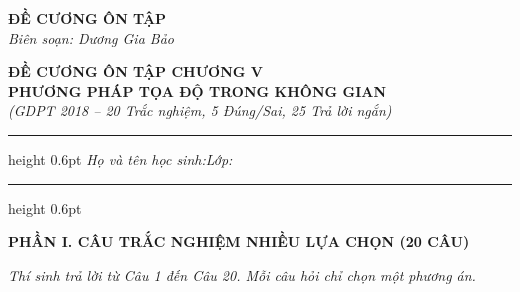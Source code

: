 \documentclass[12pt,a4paper]{article}
\begin{document}
\thispagestyle{firstpage}

\noindent
\begin{minipage}[t]{0.36\textwidth}
    \centering
    {\fontsize{12}{14}\selectfont\textbf{ĐỀ CƯƠNG ÔN TẬP}}\\[4pt]
    \textit{Biên soạn: Dương Gia Bảo}\\[6pt]
    \setlength{\fboxrule}{0.8pt}
    \setlength{\fboxsep}{5pt}
\end{minipage}\hfill
\begin{minipage}[t]{0.62\textwidth}
    \centering
    {\fontsize{13}{15}\selectfont\textbf{ĐỀ CƯƠNG ÔN TẬP CHƯƠNG V}}\\[3pt]
    {\fontsize{12}{14}\selectfont\textbf{PHƯƠNG PHÁP TỌA ĐỘ TRONG KHÔNG GIAN}}\\[3pt]
    {\fontsize{11}{13}\selectfont\textit{(GDPT 2018 -- 20 Trắc nghiệm, 5 Đúng/Sai, 25 Trả lời ngắn)}}
\end{minipage}

\par\vspace{4pt}
\hrule height 0.6pt
\vspace{4pt}
\noindent\textit{Họ và tên học sinh:}\dotfill\hspace{0.8cm}\textit{Lớp:}\makebox[3.2cm]{\dotfill}
\par\vspace{3pt}
\hrule height 0.6pt
\vspace{6pt}

\begin{center}
    {\fontsize{13}{15}\selectfont\textbf{PHẦN I. CÂU TRẮC NGHIỆM NHIỀU LỰA CHỌN (20 CÂU)}}
\end{center}
\textit{Thí sinh trả lời từ Câu 1 đến Câu 20. Mỗi câu hỏi chỉ chọn một phương án.}
\end{document}
